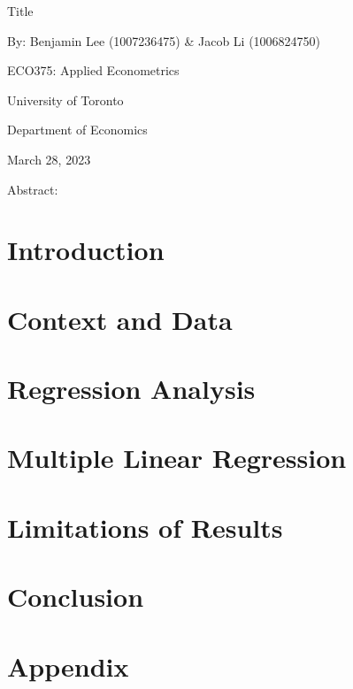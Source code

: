 \documentclass{eco_375_paper}
\begin{document}
\vspace*{\fill}
\begin{center}
	Title 
	
	By: Benjamin Lee (1007236475) \& Jacob Li (1006824750)
	\bigskip
	
	ECO375: Applied Econometrics 
	
	University of Toronto
	
	Department of Economics
	
	March 28, 2023
	
	\bigskip
	Abstract:
\end{center}
\vspace*{\fill}
\pagebreak

\section{Introduction}
\section{Context and Data}
\section{Regression Analysis}
\section{Multiple Linear Regression}
\section{Limitations of Results}
\section{Conclusion}
\section{Appendix}
\end{document}
